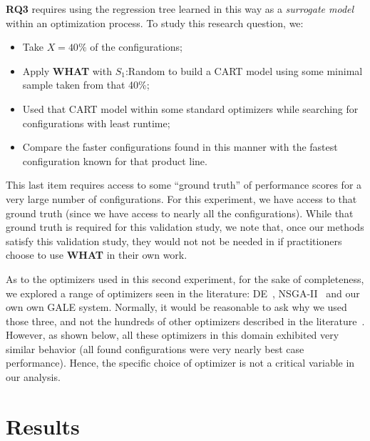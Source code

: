 \documentclass{sig-alternative}
\newcommand{\bi}{\begin{itemize}}%
\newcommand{\ei}{\end{itemize}}
\newcommand{\what}{{\bf WHAT }}
\begin{document}
{\bf RQ3} requires using the regression tree learned in this way as a {\em surrogate model} within an optimization process. To study this research question, we:
\bi
\item Take   $X=40\%$ of the configurations;
\item Apply \what with $S_1$:Random to build a CART model using some minimal sample taken from that 40\%;
\item Used that CART model within some standard optimizers while searching for 
configurations with least runtime;
\item  Compare the faster configurations found in this manner with the fastest configuration
known for that product line.
\ei
This last item requires access to some ``ground truth'' of performance scores for a very
large number of configurations. For this experiment, we have access to that ground truth
(since we have access to nearly all the configurations). While that ground truth is required for this
validation study, we note that, once our methods satisfy this validation study,
they would not not be needed in if practitioners choose to use \what in their own work.

As to the optimizers used in this second experiment, for the sake of completeness, we explored
a range of optimizers seen in the   literature:  DE~\cite{storn1997differential}, NSGA-II~\cite{deb00afast}
and our own   own GALE\cite{krall2014gale,zuluaga2013active} system.   Normally,
it would be  reasonable to ask
why we used those three, and not the hundreds of other 
optimizers described in the literature~\cite{fletcher13,harman12}. However,
as shown below, all these optimizers in this
domain exhibited  very similar
behavior (all found configurations were very nearly
best case performance). Hence, the specific
choice of optimizer is not a critical
variable in  our analysis.


\section{Results}
\end{document}
